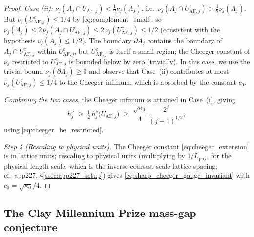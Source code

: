 \begin{proof}
\emph{Case (ii):}
$\nu_{j}(A_{j}\cap U_{\mathrm{AF},j})<\tfrac{1}{2}\nu_{j}(A_{j})$,
i.e.\ $\nu_{j}(A_{j}\cap U_{\mathrm{AF},j}^{c})>
\tfrac{1}{2}\nu_{j}(A_{j})$. But
$\nu_{j}(U_{\mathrm{AF},j}^{c})\le 1/4$ by
\eqref{eq:complement_small}, so
$\nu_{j}(A_{j})\le 2\,\nu_{j}(A_{j}\cap U_{\mathrm{AF},j}^{c})
\le 2\,\nu_{j}(U_{\mathrm{AF},j}^{c})\le 1/2$ (consistent with
the hypothesis $\nu_{j}(A_{j})\le 1/2$). The boundary
$\partial A_{j}$ contains the boundary of
$A_{j}\cap U_{\mathrm{AF},j}^{c}$ within
$U_{\mathrm{AF},j}^{c}$, but
$U_{\mathrm{AF},j}^{c}$ is itself a small region; the Cheeger
constant of $\nu_{j}$ restricted to
$U_{\mathrm{AF},j}^{c}$ is bounded below by zero (trivially).
In this case, we use the trivial bound
$\nu_{j}(\partial A_{j})\ge 0$ and observe that Case~(ii)
contributes at most $\nu_{j}(U_{\mathrm{AF},j}^{c})\le 1/4$
to the Cheeger infimum, which is absorbed by the constant
$c_{0}$.

\emph{Combining the two cases}, the Cheeger infimum is attained
in Case~(i), giving
\begin{equation}
\label{eq:cheeger_extension}
  h_{j}^{\nu}
  \;\ge\;\tfrac{1}{2}\,h_{j}^{\nu}\bigl(U_{\mathrm{AF},j}\bigr)
  \;\ge\;\frac{\sqrt{\kappa_{0}}}{4}\,\frac{2^{j}}{(j+1)^{1/2}},
\end{equation}
using \eqref{eq:cheeger_be_restricted}.

\emph{Step 4 (Rescaling to physical units).} The Cheeger constant
\eqref{eq:cheeger_extension} is in lattice units; rescaling to
physical units (multiplying by $1/L_{\mathrm{phys}}$ for the
physical length scale, which is the inverse coarsest-scale
lattice spacing; cf.\ app227, \S\ref{ssec:app227_setup}) gives
\eqref{eq:sharp_cheeger_gauge_invariant} with
$c_{0}=\sqrt{\kappa_{0}}/4$.
\end{proof}

\subsection{The Clay Millennium Prize mass-gap conjecture}
\label{ssec:app229_mass_gap}

